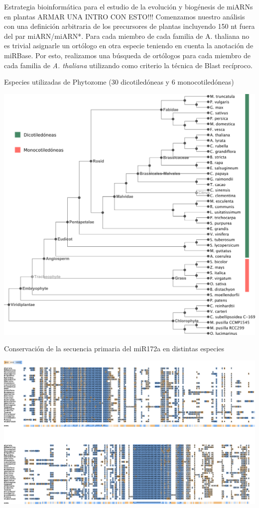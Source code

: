 \documentclass{beamer}
\begin{document}
\begin{frame}{Estrategia bioinformática para el estudio de la evolución y biogénesis de miARNs en plantas}
ARMAR UNA INTRO CON ESTO!!!
    Comenzamos nuestro análisis con una definición arbitraria de los precursores de plantas incluyendo 150 nt fuera del par miARN/miARN*.
    Para cada miembro de cada familia de A. thaliana no es trivial asignarle un ortólogo en otra especie teniendo en cuenta la anotación de miRBase. 
    Por esto, realizamos una búsqueda de ortólogos para cada miembro de cada familia de \textit{A. thaliana} utilizando como criterio la técnica de Blast recíproco.
\end{frame}


\begin{frame}{Especies utilizadas de Phytozome (30 dicotiledóneas y 6 monocotiledóneas)}
	\begin{center}
		\includegraphics[width=.6\textwidth]{img/treePhytozome.png}
	\end{center}
\end{frame}



\begin{frame}{Conservación de la secuencia primaria del miR172a en distintas especies}
	\begin{center}
		\includegraphics[width=1\textwidth]{img/miR172a_tcoffee_01.png}
	\end{center}
\end{frame}
\end{document}
